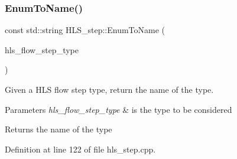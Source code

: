 \subsubsection{\texorpdfstring{Enum\+To\+Name()}{EnumToName()}}
{\footnotesize\ttfamily const std\+::string H\+L\+S\+\_\+step\+::\+Enum\+To\+Name (\begin{DoxyParamCaption}\item[{const \hyperlink{hls__step_8hpp_ada16bc22905016180e26fc7e39537f8d}{H\+L\+S\+Flow\+Step\+\_\+\+Type}}]{hls\+\_\+flow\+\_\+step\+\_\+type }\end{DoxyParamCaption})\hspace{0.3cm}{\ttfamily [static]}}



Given a H\+LS flow step type, return the name of the type. 


\begin{DoxyParams}{Parameters}
{\em hls\+\_\+flow\+\_\+step\+\_\+type} & is the type to be considered \\
\hline
\end{DoxyParams}
\begin{DoxyReturn}{Returns}
the name of the type 
\end{DoxyReturn}


Definition at line 122 of file hls\+\_\+step.\+cpp.



